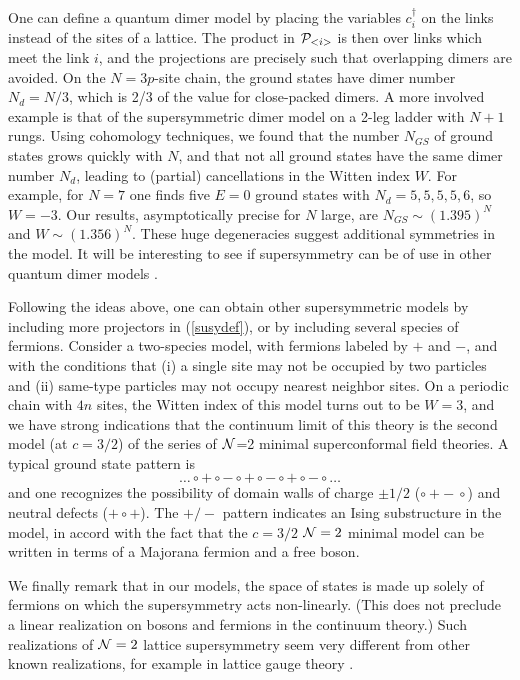 \documentclass[a4paper,prl,aps,twocolumn]{revtex4}
\begin{document}
  
One can define a quantum dimer model by placing the variables
$c_i^\dagger$ on the links instead of the sites of a lattice.
The product in ${\cal P}_{<i>}$ is then over links which
meet the link $i$, and the projections are precisely
such that overlapping dimers are avoided. On the $N=3p$-site chain, the
ground states have dimer number $N_d=N/3$, which is 2/3 of the
value for close-packed dimers. A more involved example is that of the
supersymmetric dimer model on a 2-leg ladder with $N+1$ rungs. Using
cohomology techniques, we found that the number $N_{GS}$ of
ground states grows quickly with $N$, and that not all
ground states have the same dimer number $N_d$, leading to (partial)
cancellations in the Witten index $W$.  For example, for $N=7$ one
finds five $E=0$ ground states with $N_d=5,5,5,5,6$, so $ W =-3$. Our results, 
asymptotically precise for $N$ large, are $N_{GS} \sim (1.395)^N$ and 
$ W \sim (1.356)^N$. These huge degeneracies suggest additional 
symmetries in the model. It will be interesting to see if supersymmetry 
can be of use in other quantum dimer models \cite{MSF}.
  
Following the ideas above, one can obtain other supersymmetric models
by including more projectors in (\ref{susydef}), or by including
several species of fermions. Consider a
two-species model, with fermions labeled by $+$ and $-$, and with the
conditions that (i) a single site may not be occupied by two particles
and (ii) same-type particles may not occupy nearest neighbor sites. On
a periodic chain with $4n$ sites, the Witten index of this model
turns out to be $W=3$, and we have strong indications that the
continuum limit of this theory is the second model (at $c=3/2$) of the
series of ${\cal N}$=2 minimal superconformal field theories. A
typical ground state pattern is
$$ \ldots 
\circ + \circ - \circ + \circ - \circ + \circ - \circ 
\ldots $$  
and one recognizes the possibility of domain walls of charge $\pm 1/2$ 
($\circ+-\ \circ$) and neutral defects ($+\circ+$). The $+/-$ pattern 
indicates an Ising substructure in the model, in accord with the fact 
that the $c=3/2$ ${\cal N}=2$ minimal model can be written in terms of 
a Majorana fermion and a free boson.   

We finally remark that in our models, the space
of states is made up solely of fermions on which the supersymmetry acts
non-linearly. (This does not preclude a linear realization 
on bosons and fermions in the continuum theory.)
Such realizations of ${\cal N}=2$ lattice
supersymmetry seem very different from other 
known realizations, for example in lattice gauge theory \cite{feo}. 
\end{document}
